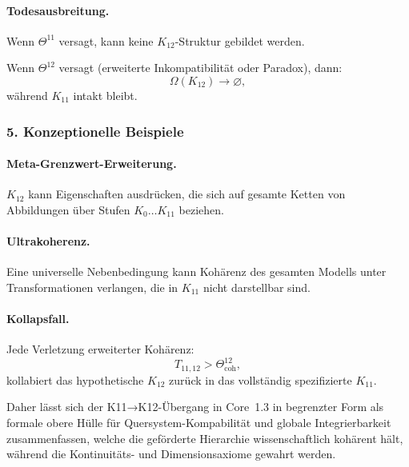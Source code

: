 \paragraph{Todesausbreitung.}
Wenn $\Theta^{11}$ versagt, kann keine $K_{12}$-Struktur gebildet werden.

Wenn $\Theta^{12}$ versagt (erweiterte Inkompatibilität oder Paradox), dann:
\[
\Omega(K_{12}) \rightarrow \varnothing,
\]
während $K_{11}$ intakt bleibt.

\subsubsection{5. Konzeptionelle Beispiele}

\paragraph{Meta-Grenzwert-Erweiterung.}
$K_{12}$ kann Eigenschaften ausdrücken, die sich auf gesamte Ketten von
Abbildungen über Stufen $K_0\dots K_{11}$ beziehen.

\paragraph{Ultrakoherenz.}
Eine universelle Nebenbedingung kann Kohärenz des gesamten Modells unter
Transformationen verlangen, die in $K_{11}$ nicht darstellbar sind.

\paragraph{Kollapsfall.}
Jede Verletzung erweiterter Kohärenz:
\[
T_{11,12} > \Theta^{12}_{\mathrm{coh}},
\]
kollabiert das hypothetische $K_{12}$ zurück in das vollständig spezifizierte
$K_{11}$.

Daher lässt sich der K11→K12-Übergang in Core~1.3 in begrenzter Form als formale
obere Hülle für Quersystem-Kompabilität und globale Integrierbarkeit zusammenfassen,
welche die geförderte Hierarchie wissenschaftlich kohärent hält, während die
Kontinuitäts- und Dimensionsaxiome gewahrt werden.
